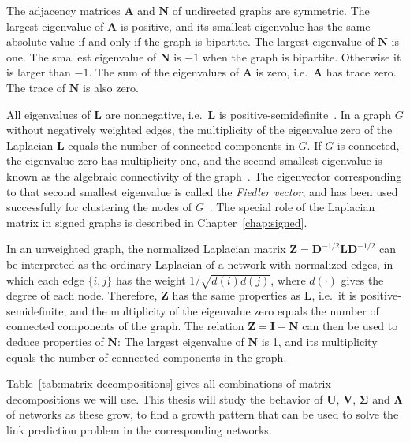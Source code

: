 \documentclass[11pt,a4paper]{book}
\begin{document}
The adjacency matrices $\mathbf A$ and $\mathbf N$ of undirected graphs
are symmetric.  
The largest eigenvalue of $\mathbf A$ is positive, and its smallest
eigenvalue has the same absolute value if and only if the graph is bipartite.    
The largest eigenvalue of $\mathbf N$ is one.  The smallest eigenvalue
of $\mathbf N$ is $-1$ when the graph is bipartite.  Otherwise it is
larger than $-1$. 
The sum of the eigenvalues of $\mathbf A$ is zero, i.e.\ $\mathbf A$ has
trace zero.  
The trace of $\mathbf N$ is also zero. 

All eigenvalues of $\mathbf L$ are nonnegative, i.e.\ $\mathbf L$ is
positive-semidefinite~\cite{b116}. 
In a graph $G$ without negatively weighted edges,
the multiplicity of the eigenvalue zero of the Laplacian $\mathbf L$
equals the number of connected components in $G$. 
If $G$ is connected, the eigenvalue zero has multiplicity one, and the
second smallest eigenvalue is known as the algebraic connectivity of the
graph~\cite{b285}.  
The eigenvector corresponding to that
second smallest eigenvalue is called the \emph{Fiedler vector}, and has
been used successfully for clustering the nodes of $G$~\cite{b246}. 
The special role of the Laplacian matrix in signed graphs is described
in Chapter~\ref{chap:signed}.  

In an unweighted graph, 
the normalized Laplacian matrix $\mathbf Z = \mathbf D^{-1/2}\mathbf L
\mathbf D^{-1/2}$ can
be interpreted as the ordinary Laplacian of a network with normalized
edges, in which each edge $\{i,j\}$ has the weight $1/\sqrt{d(i)d(j)}$,
where $d(\cdot)$ gives the degree of each node.  Therefore, $\mathbf Z$
has the same properties as $\mathbf L$, i.e.\ it is
positive-semidefinite, and the multiplicity of the
eigenvalue zero equals the number of connected components of the graph.  
The relation $\mathbf Z = \mathbf I - \mathbf N$ can then be used to
deduce properties of $\mathbf N$:  The largest eigenvalue of $\mathbf N$
is 1, and its multiplicity equals the number of connected components in
the graph. 

Table~\ref{tab:matrix-decompositions} gives all combinations of matrix
decompositions we will use. 
This thesis will study the behavior of $\mathbf U$, $\mathbf V$,
$\mathbf \Sigma$ and $\mathbf \Lambda$ of networks as these grow, to
find a growth pattern that can be used to solve the link prediction
problem in the corresponding networks. 
\end{document}
